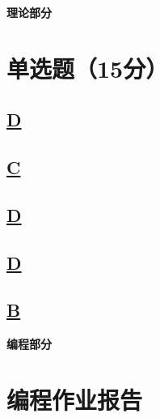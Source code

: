 \documentclass[a4paper]{article}
\begin{document}
\courseheader
\vspace{3mm}
\centerline{\textbf{\Large{理论部分}}}

\section{单选题（15分）}
\subsection{\underline{D}}

\subsection{\underline{C}}

\subsection{\underline{D}}

\subsection{\underline{D}}

\subsection{\underline{B}}
\clearpage




\vspace{3mm}
\centerline{\textbf{\Large{编程部分}}}


\vspace{3mm}
\section{编程作业报告}
\end{document}
